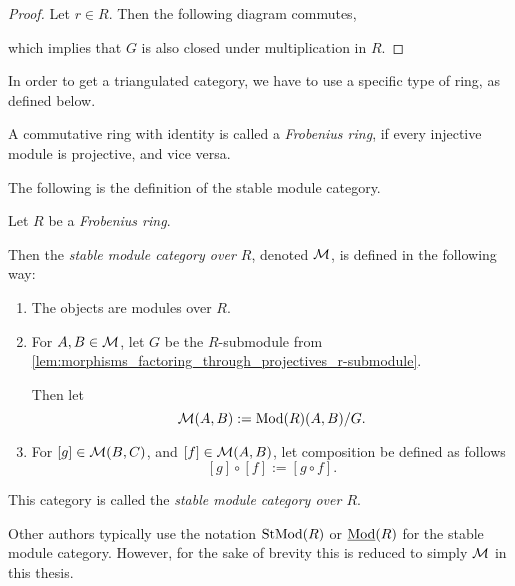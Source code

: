 \begin{proof}
    Let \( r \in R \). Then the following diagram commutes,
    \begin{center}
    \end{center}
    which implies that \( G \) is also closed under multiplication in \( R \).
\end{proof}

In order to get a triangulated category, we have to use a specific type of ring, as defined below.
\begin{definition}
    A commutative ring with identity is called a \emph{Frobenius ring}, if every injective module is projective, and vice versa.
\end{definition}

The following is the definition of the stable module category.
\begin{definition}
    \label{def:stable_module_category}
    Let \( R \) be a \emph{Frobenius ring}.

    Then the \emph{stable module category over \( R \)}, denoted \( {\mathcal{M}} \), is defined in the following way:
    \begin{enumerate}
        \item {
            The objects are modules over \( R \).
        }
        \item {
            For \( A, B \in {\mathcal{M}} \), let \( G \) be the \( R \)-submodule from \autoref{lem:morphisms_factoring_through_projectives_r-submodule}.
        
            Then let
            \[
                {\mathcal{M}}(A, B) := \operatorname{Mod}(R)(A, B)/G.
            \]
        }
        \item {
            For \( [g] \in {\mathcal{M}}(B, C) \), and \( [f] \in {\mathcal{M}}(A, B) \), let composition be defined as follows
            \[
                [g] \circ [f] := [g \circ f].
            \]
        }
    \end{enumerate}
    This category is called the \emph{stable module category over \( R \)}.
\end{definition}

Other authors typically use the notation \( \operatorname{StMod}(R) \) or \( \underline{\operatorname{Mod}}(R) \) for the stable module category. However, for the sake of brevity this is reduced to simply \( {\mathcal{M}} \) in this thesis.

